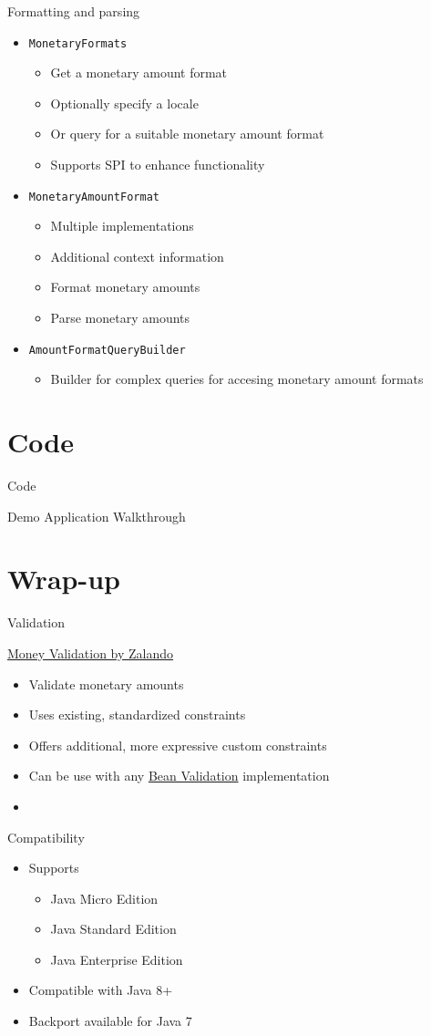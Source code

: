 \documentclass{beamer}
\newcommand{\code}[1]{\texttt{#1}}
\newcommand{\listing}[1]{
	\begin{itemize}
		\item[]
	\end{itemize}
}
\newcommand{\slideItems}[1]{
	\begin{itemize}
		#1
	\end{itemize}
}
\newcommand{\slide}[2]{
	\begin{frame}{#1}
		#2
	\end{frame}
}
\begin{document}
\slide{Formatting and parsing}{
	\slideItems{
		\item \code{MonetaryFormats}
			\slideItems{
				\item Get a monetary amount format
				\item Optionally specify a locale
				\item Or query for a suitable monetary amount format
				\item Supports SPI to enhance functionality
			}
		\item \code{MonetaryAmountFormat}
			\slideItems{
				\item Multiple implementations
				\item Additional context information
				\item Format monetary amounts
				\item Parse monetary amounts
			}
		\item \code{AmountFormatQueryBuilder}
			\slideItems{
				\item Builder for complex queries for accesing monetary amount formats
			}
	}
}

\section{Code}

\slide{}{
	\begin{center}
		\huge{Code}
	
		\large{Demo Application Walkthrough}
	\end{center}
}

\section{Wrap-up}

\slide{Validation}{
	\href{https://github.com/zalando/money-validation}{Money Validation by Zalando}
	\slideItems{
		\item Validate monetary amounts
		\item Uses existing, standardized constraints
		\item Offers additional, more expressive custom constraints
		\item Can be use with any \href{http://beanvalidation.org/}{Bean Validation} implementation
	}
	\listing{validation.java}
}

\slide{Compatibility}{
	\slideItems{
		\item Supports
			\slideItems{
				\item Java Micro Edition
				\item Java Standard Edition
				\item Java Enterprise Edition
			}
		\item Compatible with Java 8+
		\item Backport available for Java 7
	}
}
\end{document}

